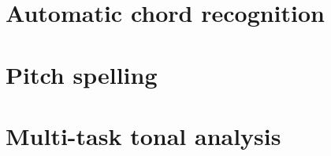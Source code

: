 \section{Automatic chord recognition}
\section{Pitch spelling}
\section{Multi-task tonal analysis}


